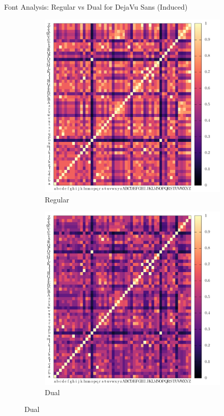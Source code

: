 \begin{frame}{Font Analysis: Regular vs Dual for DejaVu Sans (Induced)}
	\begin{figure}
		\centering
		\begin{subfigure}[b]{0.4\linewidth}
			\includegraphics[width=\linewidth, height=0.9\linewidth]{../tables/dejavu-sans/induced-conf-nrm.pdf}
			\caption{
				Regular
			}
		\end{subfigure}
		\begin{subfigure}[b]{0.4\linewidth}
			\includegraphics[width=\linewidth, height=0.9\linewidth]{../tables/dual-dejavu-sans/induced-conf-nrm.pdf}
			\caption{
				Dual
			}
		\end{subfigure}
	\end{figure}
	

\end{frame}
